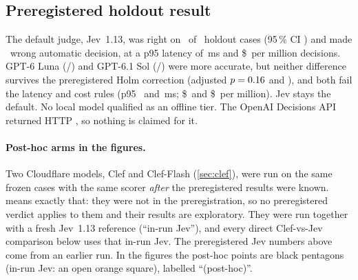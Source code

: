 \subsection{Preregistered holdout result \texorpdfstring{\prereg}{[preregistered]}}

\begin{table}[htbp]
\centering\scriptsize
\caption{Judge benchmark holdout (\HoldN\ cases, \HoldReps\ repetitions, the bundle's gate): accuracy, wrong
automatic decisions, coverage, latency and cost per million decisions. Preregistered run only; the post-hoc
Cloudflare Clef arms and their in-run Jev reference are in \cref{tab:clefresults}.}
\label{tab:jbheadline}

\end{table}

The default judge, Jev~1.13, was right on \JevHoldAccK\ of \HoldN\ holdout cases (95\,\% CI \JevHoldAccCI) and
made \JevHoldWaK\ wrong automatic decision, at a p95 latency of \JevHoldPninetyfive\,ms and \$\JevHoldCost\ per
million decisions. GPT-6 Luna (\LunaHoldAccK/\HoldN) and GPT-6.1 Sol (\SolHoldAccK/\HoldN) were more accurate,
but neither difference survives the preregistered Holm correction (adjusted $p = 0.16$ and
\SolHoldRAccPHolm), and both fail the latency and cost rules (p95 \LunaHoldPninetyfive\ and
\SolHoldPninetyfive\,ms; \$\LunaHoldCost\ and \$\SolHoldCost\ per million). Jev stays the default. No local model
qualified as an offline tier. The OpenAI Decisions API returned HTTP \HoldProbeStatus, so nothing is claimed
for it.

\paragraph{Post-hoc arms in the figures.} Two Cloudflare models, Clef and Clef-Flash (\cref{sec:clef}), were run on
the same frozen cases with the same scorer \emph{after} the preregistered results were known.  means
exactly that: they were not in the preregistration, so no preregistered verdict applies to them and their results
are exploratory. They were run together with a fresh Jev~1.13 reference (``in-run Jev''), and every direct Clef-vs-Jev
comparison below uses that in-run Jev. The preregistered Jev numbers above come from an earlier run. In the figures
the post-hoc points are black pentagons (in-run Jev: an open orange square), labelled ``(post-hoc)''.

